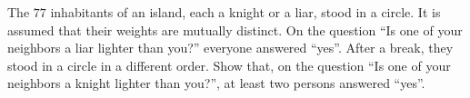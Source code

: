 \problem
The $77$ inhabitants of an island, each a knight or a liar, stood in a circle.
It is assumed that their weights are mutually distinct.
On the question ``Is one of your neighbors a liar lighter than you?'' everyone
answered ``yes''.
After a break, they stood in a circle in a different order.
Show that, on the question
``Is one of your neighbors a knight lighter than you?'',
at least two persons answered ``yes''.
\solution
\endproblem
